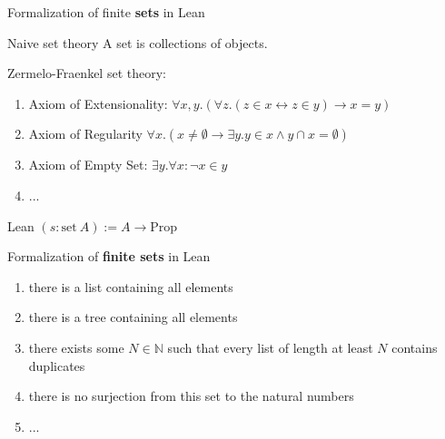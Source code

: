 \documentclass[aspectratio=169]{beamer}
\begin{document}
    \begin{frame}{Formalization of finite \textbf{sets} in Lean}
        \begin{block}{Naive set theory}
            A set is collections of objects.
        \end{block}
        \pause
        \begin{block}{Zermelo-Fraenkel set theory:}
        \begin{enumerate}
            \item Axiom of Extensionality:
            $\forall x, y.(\forall z. (z \in x \leftrightarrow z \in y) \rightarrow x=y)$
            
            \item Axiom of Regularity 
            $\forall x. (x \neq \emptyset \rightarrow \exists y. y \in x \land y \cap x = \emptyset ) $
            
            \item Axiom of Empty Set: $\exists y. \forall x: \neg x \in y$
            \item ...
            
        \end{enumerate}
        \end{block}
        \pause
        \begin{block}{Lean}
        $(s: \text{{set}}\ A) := A \to \text{{Prop}}$
        \end{block}
    \end{frame}
    \begin{frame}{Formalization of \textbf{finite sets} in Lean}
        \begin{enumerate}[<+->]
            \item there is a list containing all elements
            \item there is a tree containing all elements
            \item there exists some $N \in \mathbb{N}$ such that every list of length at least $N$ contains duplicates
            \item there is no surjection from this set to the natural numbers
            \item ...
        \end{enumerate}
    \end{frame}
\end{document}
